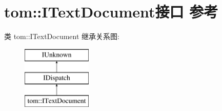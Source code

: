 \hypertarget{interfacetom_1_1_i_text_document}{}\section{tom\+:\+:I\+Text\+Document接口 参考}
\label{interfacetom_1_1_i_text_document}
类 tom\+:\+:I\+Text\+Document 继承关系图\+:\begin{figure}[H]
\begin{center}
\leavevmode
\includegraphics[height=3.000000cm]{interfacetom_1_1_i_text_document}
\end{center}
\end{figure}
